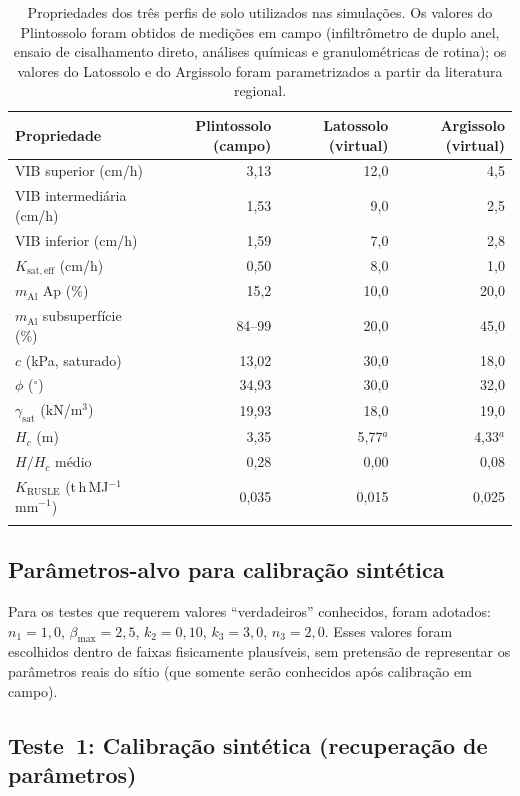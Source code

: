 \documentclass[pdflatex,sn-basic]{sn-jnl}
\begin{document}
\begin{table}[htbp]
\centering
\caption{Propriedades dos três perfis de solo utilizados nas simulações. Os valores do Plintossolo foram obtidos de medições em campo (infiltrômetro de duplo anel, ensaio de cisalhamento direto, análises químicas e granulométricas de rotina); os valores do Latossolo e do Argissolo foram parametrizados a partir da literatura regional.}
\label{tab:profiles}
\small
\begin{tabular}{@{}l r r r@{}}
\toprule
Propriedade & Plintossolo (campo) & Latossolo (virtual) & Argissolo (virtual) \\
\midrule
VIB superior (cm/h) & 3,13 & 12,0 & 4,5 \\
VIB intermediária (cm/h) & 1,53 & 9,0 & 2,5 \\
VIB inferior (cm/h) & 1,59 & 7,0 & 2,8 \\
$K_{\mathrm{sat,eff}}$ (cm/h) & 0,50 & 8,0 & 1,0 \\
$m_{\mathrm{Al}}$ Ap (\%) & 15,2 & 10,0 & 20,0 \\
$m_{\mathrm{Al}}$ subsuperfície (\%) & 84--99 & 20,0 & 45,0 \\
$c$ (kPa, saturado) & 13,02 & 30,0 & 18,0 \\
$\phi$ ($^\circ$) & 34,93 & 30,0 & 32,0 \\
$\gamma_{\mathrm{sat}}$ (kN/m$^3$) & 19,93 & 18,0 & 19,0 \\
$H_c$ (m) & 3,35 & 5,77$^a$ & 4,33$^a$ \\
$H/H_c$ médio & 0,28 & 0,00 & 0,08 \\
$K_{\mathrm{RUSLE}}$ (t\,h\,MJ$^{-1}$\,mm$^{-1}$) & 0,035 & 0,015 & 0,025 \\
\botrule
\end{tabular}
\end{table}

\subsection{Parâmetros-alvo para calibração sintética}

Para os testes que requerem valores ``verdadeiros'' conhecidos, foram adotados: $n_1 = 1{,}0$, $\beta_{\max} = 2{,}5$, $k_2 = 0{,}10$, $k_3 = 3{,}0$, $n_3 = 2{,}0$. Esses valores foram escolhidos dentro de faixas fisicamente plausíveis, sem pretensão de representar os parâmetros reais do sítio (que somente serão conhecidos após calibração em campo).

\subsection{Teste~1: Calibração sintética (recuperação de parâmetros)}
\end{document}
